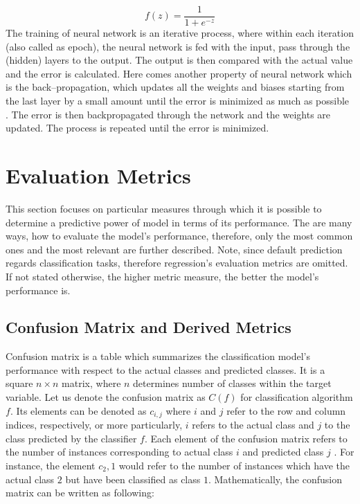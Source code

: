 \begin{equation}
    f(z) = \frac{1}{1+e^{-z}}
\end{equation}
The training of neural network is an iterative process, where within each iteration (also called as epoch), the neural network is fed with the input, pass through the (hidden) layers to the output. The output is then compared with the actual value and the error is calculated.
Here comes another property of neural network which is the back--propagation, which updates all the weights and biases starting from the last layer by a small amount until the error is minimized as much as possible \citep{ayyadevara2018pro}.
The error is then backpropagated through the network and the weights are updated. The process is repeated until the error is minimized.

\section{Evaluation Metrics}

This section focuses on particular measures through which it is possible to determine a predictive power of model in terms of its performance.
The are many ways, how to evaluate the model's performance, therefore, only the most common ones and the most relevant are further described.
Note, since default prediction regards classification tasks, therefore regression's evaluation metrics are omitted.
If not stated otherwise, the higher metric measure, the better the model's performance is.
\subsection{Confusion Matrix and Derived Metrics}


Confusion matrix is a table which summarizes the classification model's performance with respect to the actual classes and predicted classes.
It is a square $n \times n$ matrix, where $n$ determines number of classes within the target variable.
Let us denote the confusion matrix as $C\left(f\right)$ for classification algorithm $f$. 
Its elements can be denoted as $c_{i,j}$ where $i$ and $j$ refer to the row and column indices, respectively, or more particularly, $i$ refers to the actual class and $j$ to the class predicted by the classifier $f$.
Each element of the confusion matrix refers to the number of instances corresponding to actual class $i$ and predicted class $j$ \citep{japkowicz2011evaluating}. For instance, the element $c_2,1$ would refer to the number of instances which have the actual class $2$ but have been classified as class $1$.
Mathematically, the confusion matrix can be written as following:

